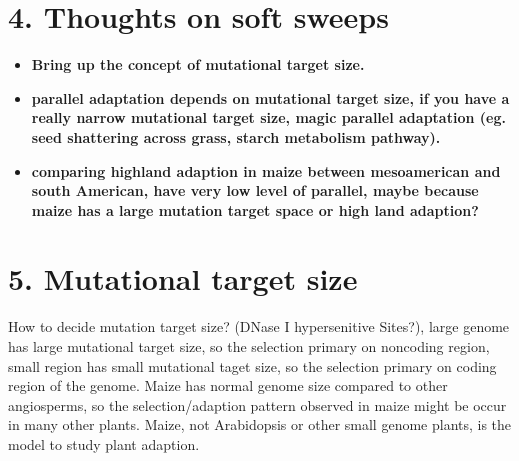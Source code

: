 \documentclass[12pt]{article}
\begin{document}
\section*{4. Thoughts on soft sweeps}
\begin{itemize}
\item \textbf{Bring up the concept of mutational target size.}

\item \textbf{parallel adaptation depends on mutational target size, if you have a really narrow mutational target size, magic parallel adaptation (eg. seed shattering across grass, starch metabolism pathway).}

\item \textbf{comparing highland adaption in maize between mesoamerican and south American, have very low level of parallel, maybe because maize has a large mutation target space or high land adaption?}
\end{itemize}

\section*{5. Mutational target size}
How to decide mutation target size? (DNase I hypersenitive Sites?), large genome has large mutational target size, so the selection primary on noncoding region, small region has small mutational taget size, so the selection primary on coding region of the genome. Maize has normal genome size compared to other angiosperms, so the selection/adaption pattern observed in maize might be occur in many other plants. Maize, not Arabidopsis or other small genome plants, is the model to study plant adaption.
\end{document}
